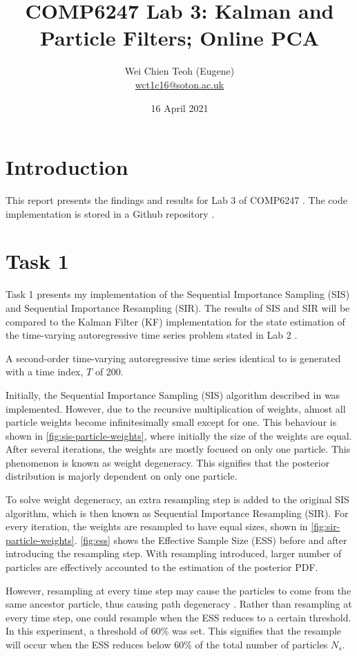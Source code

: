 \documentclass{article}
\title{COMP6247 Lab 3: Kalman and Particle Filters; Online PCA}
\author{Wei Chien Teoh (Eugene)\\\bigskip \href{mailto:wct1c16@soton.ac.uk}{wct1c16@soton.ac.uk}}
\date{16 April 2021}
\begin{document}
\maketitle

\section{Introduction}

This report presents the findings and results for Lab 3 of COMP6247 \cite{lab3}. The code implementation is stored in a Github repository \cite{github}.

\section{Task 1} \label{sec:task-1}

Task 1 presents my implementation of the Sequential Importance Sampling (SIS) and Sequential Importance Resampling (SIR). The results of SIS and SIR will be compared to the Kalman Filter (KF) implementation \cite{lab2ans} for the state estimation of the time-varying autoregressive time series problem stated in Lab 2 \cite{lab2}.

A second-order time-varying autoregressive time series identical to \cite{lab2} is generated with a time index, $T$ of 200.

Initially, the Sequential Importance Sampling (SIS) algorithm described in \cite{particle_filters} was implemented. However, due to the recursive multiplication of weights, almost all particle weights become infinitesimally small except for one. This behaviour is shown in \cref{fig:sis-particle-weights}, where initially the size of the weights are equal. After several iterations, the weights are mostly focused on only one particle. This phenomenon is known as weight degeneracy. This signifies that the posterior distribution is majorly dependent on only one particle.

To solve weight degeneracy, an extra resampling step \cite{particle_filters} is added to the original SIS algorithm, which is then known as Sequential Importance Resampling (SIR). For every iteration, the weights are resampled to have equal sizes, shown in \cref{fig:sir-particle-weights}. \cref{fig:ess} shows the Effective Sample Size (ESS) before and after introducing the resampling step. With resampling introduced, larger number of particles are effectively accounted to the estimation of the posterior PDF.

However, resampling at every time step may cause the particles to come from the same ancestor particle, thus causing path degeneracy \cite{lecture6}. Rather than resampling at every time step, one could resample when the ESS reduces to a certain threshold. In this experiment, a threshold of 60\% was set. This signifies that the resample will occur when the ESS reduces below 60\% of the total number of particles $N_s$.
\end{document}

